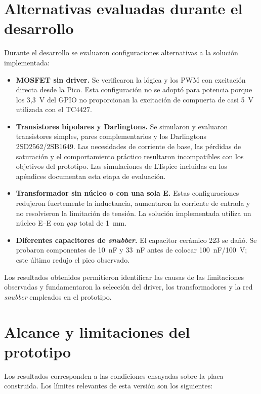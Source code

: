 \documentclass[conference]{IEEEtran}
\begin{document}
\section{Alternativas evaluadas durante el desarrollo}

Durante el desarrollo se evaluaron configuraciones alternativas a la solución implementada:

\begin{itemize}
\item \textbf{MOSFET sin driver.} Se verificaron la lógica y los PWM con excitación directa desde la Pico. Esta configuración no se adoptó para potencia porque los 3,3~V del GPIO no proporcionan la excitación de compuerta de casi 5~V utilizada con el TC4427.
\item \textbf{Transistores bipolares y Darlingtons.} Se simularon y evaluaron transistores simples, pares complementarios y los Darlingtons 2SD2562/2SB1649. Las necesidades de corriente de base, las pérdidas de saturación y el comportamiento práctico resultaron incompatibles con los objetivos del prototipo. Las simulaciones de LTspice incluidas en los apéndices documentan esta etapa de evaluación.
\item \textbf{Transformador sin núcleo o con una sola E.} Estas configuraciones redujeron fuertemente la inductancia, aumentaron la corriente de entrada y no resolvieron la limitación de tensión. La solución implementada utiliza un núcleo E--E con \textit{gap} total de 1~mm.
\item \textbf{Diferentes capacitores de \textit{snubber}.} El capacitor cerámico 223 se dañó. Se probaron componentes de 10~nF y 33~nF antes de colocar 100~nF/100~V; este último redujo el pico observado.
\end{itemize}

Los resultados obtenidos permitieron identificar las causas de las limitaciones observadas y fundamentaron la selección del driver, los transformadores y la red \textit{snubber} empleados en el prototipo.

\section{Alcance y limitaciones del prototipo}

Los resultados corresponden a las condiciones ensayadas sobre la placa construida. Los límites relevantes de esta versión son los siguientes:
\end{document}
